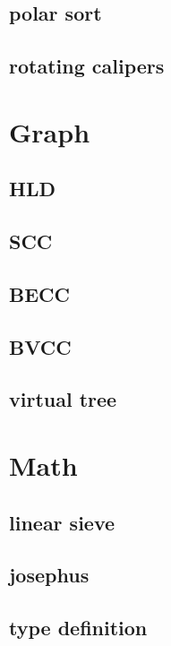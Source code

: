 \subsection{polar sort}

\subsection{rotating calipers}


\section{Graph}
\subsection{HLD}

\subsection{SCC}

\subsection{BECC}

\subsection{BVCC}

\subsection{virtual tree}


\section{Math}
\subsection{linear sieve}

\subsection{josephus}

\subsection{type definition}

